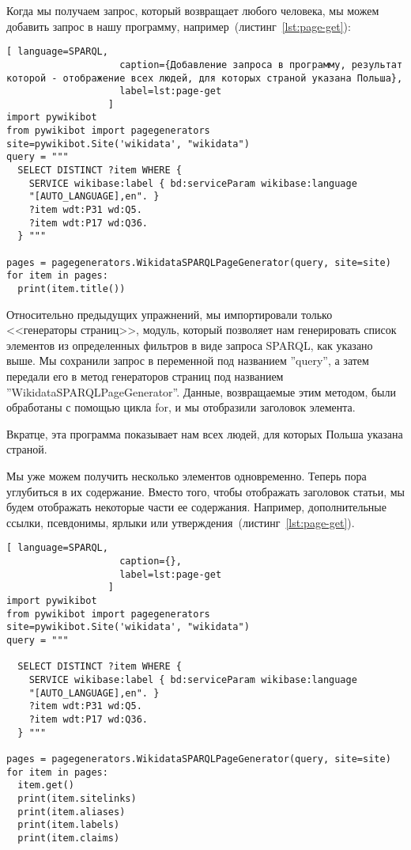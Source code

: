 Когда мы получаем запрос, который возвращает любого человека, мы можем добавить запрос в нашу программу, например~(листинг~\ref{lst:page-get}):

\begin{lstlisting}[ language=SPARQL,
                    caption={Добавление запроса в программу, результат которой - отображение всех людей, для которых страной указана Польша},
                    label=lst:page-get
                  ]
import pywikibot
from pywikibot import pagegenerators
site=pywikibot.Site('wikidata', "wikidata")
query = """
  SELECT DISTINCT ?item WHERE {
    SERVICE wikibase:label { bd:serviceParam wikibase:language 
    "[AUTO_LANGUAGE],en". }
    ?item wdt:P31 wd:Q5.
    ?item wdt:P17 wd:Q36.
  } """

pages = pagegenerators.WikidataSPARQLPageGenerator(query, site=site)
for item in pages:
  print(item.title())
\end{lstlisting}    

Относительно предыдущих упражнений, мы импортировали только <<генераторы страниц>>, модуль, который позволяет нам генерировать список элементов из определенных фильтров в виде запроса SPARQL, как указано выше. Мы сохранили запрос в переменной под названием ''query'', а затем передали его в метод генераторов страниц под названием ''WikidataSPARQLPageGenerator''. Данные, возвращаемые этим методом, были обработаны с помощью цикла for, и мы отобразили заголовок элемента.

Вкратце, эта программа показывает нам всех людей, для которых Польша указана страной.

Мы уже можем получить несколько элементов одновременно. Теперь пора углубиться в их содержание. Вместо того, чтобы отображать заголовок статьи, мы будем отображать некоторые части ее содержания. Например, дополнительные ссылки, псевдонимы, ярлыки или утверждения~(листинг~\ref{lst:page-get}).

\begin{lstlisting}[ language=SPARQL,
                    caption={},
                    label=lst:page-get
                  ]
import pywikibot
from pywikibot import pagegenerators
site=pywikibot.Site('wikidata', "wikidata")
query = """

  SELECT DISTINCT ?item WHERE {
    SERVICE wikibase:label { bd:serviceParam wikibase:language 
    "[AUTO_LANGUAGE],en". }
    ?item wdt:P31 wd:Q5.
    ?item wdt:P17 wd:Q36.
  } """

pages = pagegenerators.WikidataSPARQLPageGenerator(query, site=site)
for item in pages:
  item.get()
  print(item.sitelinks)
  print(item.aliases)
  print(item.labels)
  print(item.claims)
\end{lstlisting} 

